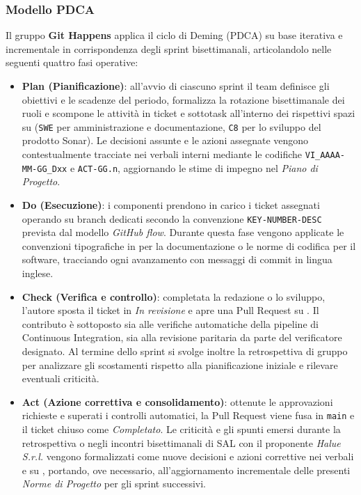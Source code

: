 \subsubsection{Modello PDCA}
Il gruppo \textbf{Git Happens} applica il ciclo di Deming (PDCA) su base iterativa e incrementale in corrispondenza degli sprint bisettimanali, articolandolo nelle seguenti quattro fasi operative:
\begin{itemize}
    \item \textbf{Plan (Pianificazione)}: all'avvio di ciascuno sprint il team definisce gli obiettivi e le scadenze del periodo, formalizza la rotazione bisettimanale dei ruoli e scompone le attività in ticket e sottotask all'interno dei rispettivi spazi su  (\texttt{SWE} per amministrazione e documentazione, \texttt{C8} per lo sviluppo del prodotto Sonar). Le decisioni assunte e le azioni assegnate vengono contestualmente tracciate nei verbali interni mediante le codifiche \texttt{VI\_AAAA-MM-GG\_Dxx} e \texttt{ACT-GG.n}, aggiornando le stime di impegno nel \textit{Piano di Progetto}.
    \item \textbf{Do (Esecuzione)}: i componenti prendono in carico i ticket assegnati operando su branch dedicati secondo la convenzione \texttt{KEY-NUMBER-DESC} prevista dal modello \emph{GitHub flow}. Durante questa fase vengono applicate le convenzioni tipografiche in \term{\LaTeX}{} per la documentazione o le norme di codifica per il software, tracciando ogni avanzamento con messaggi di commit in lingua inglese.
    \item \textbf{Check (Verifica e controllo)}: completata la redazione o lo sviluppo, l'autore sposta il ticket in \emph{In revisione} e apre una Pull Request su . Il contributo è sottoposto sia alle verifiche automatiche della pipeline di Continuous Integration, sia alla revisione paritaria da parte del verificatore designato. Al termine dello sprint si svolge inoltre la retrospettiva di gruppo per analizzare gli scostamenti rispetto alla pianificazione iniziale e rilevare eventuali criticità.
    \item \textbf{Act (Azione correttiva e consolidamento)}: ottenute le approvazioni richieste e superati i controlli automatici, la Pull Request viene fusa in \texttt{main} e il ticket  chiuso come \emph{Completato}. Le criticità e gli spunti emersi durante la retrospettiva o negli incontri bisettimanali di SAL con il proponente \textit{Halue S.r.l.} vengono formalizzati come nuove decisioni e azioni correttive nei verbali e su , portando, ove necessario, all'aggiornamento incrementale delle presenti \textit{Norme di Progetto} per gli sprint successivi.
\end{itemize}

